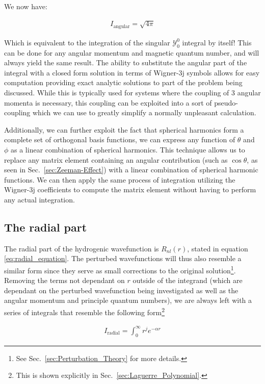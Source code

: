         We now have: 

        \begin{align}
            I_{\text{angular}} = \sqrt{4\pi}
        \end{align}

        Which is equivalent to the integration of the singular $\mathcal{Y}^0_0$ integral by itself! This can be done for any angular momentum and magnetic quantum number, and will always yield the same result. The ability to substitute the angular part of the integral with a closed form solution in terms of Wigner-3j symbols allows for easy computation providing exact analytic solutions to part of the problem being discussed. While this is typically used for systems where the coupling of 3 angular momenta is necessary, this coupling can be exploited into a sort of pseudo-coupling which we can use to greatly simplify a normally unpleasant calculation.

        Additionally, we can further exploit the fact that spherical harmonics form a complete set of orthogonal basis functions, we can express any function of $\theta$ and $\phi$ as a linear combination of spherical harmonics. This technique allows us to replace any matrix element containing an angular contribution (such as $\cos \theta$, as seen in Sec.~\ref{sec:Zeeman-Effect}) with a linear combination of spherical harmonic functions. We can then apply the same process of integration utilizing the Wigner-3j coefficients to compute the matrix element without having to perform any actual integration.


        \subsection{The radial part} \label{sec:The_Radial_Part}
            The radial part of the hydrogenic wavefunction is $R_{nl}(r)$, stated in equation \ref{eq:radial_equation}. The perturbed wavefunctions will thus also resemble a similar form since they serve as small corrections to the original solution\footnote{See Sec.~\ref{sec:Perturbation_Theory} for more details.}. Removing the terms not dependant on $r$ outside of the integrand (which are dependant on the perturbed wavefunction being investigated as well as the angular momentum and principle quantum numbers), we are always left with a series of integrals that resemble the following form\footnote{This is shown explicitly in Sec.~\ref{sec:Laguerre_Polynomial}.}

            \begin{align}
                I_{\text{radial}} = \int_0^\infty r^j e^{-\alpha r}
            \end{align}

